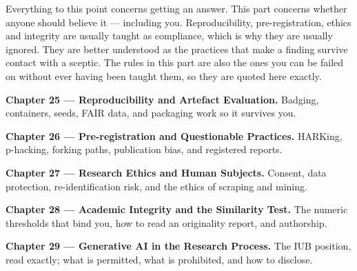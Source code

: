 
Everything to this point concerns getting an answer. This part concerns
whether anyone should believe it --- including you. Reproducibility,
pre-registration, ethics and integrity are usually taught as compliance, which
is why they are usually ignored. They are better understood as the practices
that make a finding survive contact with a sceptic. The rules in this part are
also the ones you can be failed on without ever having been taught them, so
they are quoted here exactly.

\begin{conceptbox}
\begin{tight}
  \item \textbf{Chapter 25 --- Reproducibility and Artefact Evaluation.} Badging, containers, seeds, FAIR data, and packaging work so it survives you.
  \item \textbf{Chapter 26 --- Pre-registration and Questionable Practices.} HARKing, p-hacking, forking paths, publication bias, and registered reports.
  \item \textbf{Chapter 27 --- Research Ethics and Human Subjects.} Consent, data protection, re-identification risk, and the ethics of scraping and mining.
  \item \textbf{Chapter 28 --- Academic Integrity and the Similarity Test.} The numeric thresholds that bind you, how to read an originality report, and authorship.
  \item \textbf{Chapter 29 --- Generative AI in the Research Process.} The IUB position, read exactly; what is permitted, what is prohibited, and how to disclose.
\end{tight}
\end{conceptbox}
